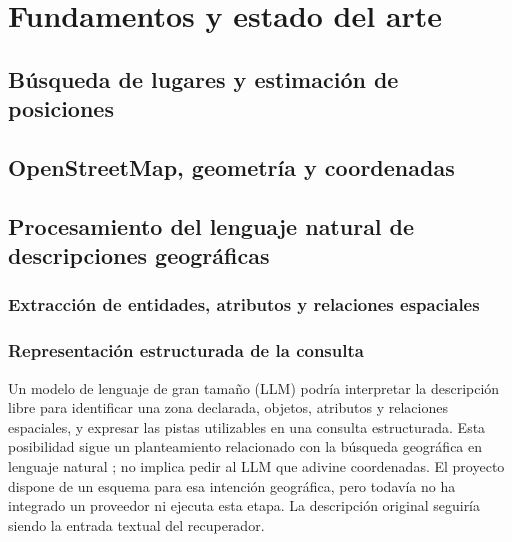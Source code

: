 \chapter{Fundamentos y estado del arte}
\label{cap:estado-arte}

\section{Búsqueda de lugares y estimación de posiciones}
\label{sec:fundamentos-tarea}

\section{OpenStreetMap, geometría y coordenadas}
\label{sec:fundamentos-osm}

\section{Procesamiento del lenguaje natural de descripciones geográficas}
\label{sec:fundamentos-pln}

\subsection{Extracción de entidades, atributos y relaciones espaciales}
\label{sec:pln-extraccion}

\subsection{Representación estructurada de la consulta}
\label{sec:pln-consulta}
Un modelo de lenguaje de gran tamaño (LLM) podría interpretar la descripción libre para identificar una zona declarada, objetos, atributos y relaciones espaciales, y expresar las pistas utilizables en una consulta estructurada. Esta posibilidad sigue un planteamiento relacionado con la búsqueda geográfica en lenguaje natural \cite{khellaf2025spot}; no implica pedir al LLM que adivine coordenadas. El proyecto dispone de un esquema para esa intención geográfica, pero todavía no ha integrado un proveedor ni ejecuta esta etapa. La descripción original seguiría siendo la entrada textual del recuperador.

